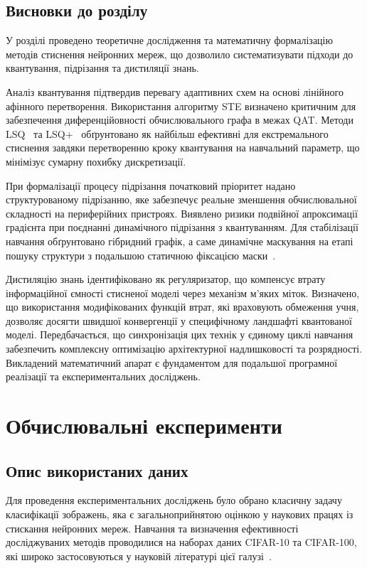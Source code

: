 \documentclass{pma-mthesis}
\begin{document}
\section{Висновки до розділу}

У розділі проведено теоретичне дослідження та математичну формалізацію методів стиснення нейронних мереж, що дозволило систематизувати підходи до квантування, підрізання та дистиляції знань.

Аналіз квантування підтвердив перевагу адаптивних схем на основі лінійного афінного перетворення. Використання алгоритму STE визначено критичним для забезпечення диференційовності обчислювального графа в межах QAT. Методи LSQ~\cite{Esser2020LSQ} та LSQ+~\cite{bhalgat2020lsq+} обґрунтовано як найбільш ефективні для екстремального стиснення завдяки перетворенню кроку квантування на навчальний параметр, що мінімізує сумарну похибку дискретизації.

При формалізації процесу підрізання початковий пріоритет надано структурованому підрізанню, яке забезпечує реальне зменшення обчислювальної складності на периферійних пристроях. Виявлено ризики подвійної апроксимації градієнта при поєднанні динамічного підрізання з квантуванням. Для стабілізації навчання обґрунтовано гібридний графік, а саме динамічне маскування на етапі пошуку структури з подальшою статичною фіксацією маски~\cite{10946020}.

Дистиляцію знань ідентифіковано як регуляризатор, що компенсує втрату інформаційної ємності стисненої моделі через механізм м’яких міток. Визначено, що використання модифікованих функцій втрат, які враховують обмеження учня, дозволяє досягти швидшої конвергенції у специфічному ландшафті квантованої моделі. Передбачається, що синхронізація цих технік у єдиному циклі навчання забезпечить комплексну оптимізацію архітектурної надлишковості та розрядності. Викладений математичний апарат є фундаментом для подальшої програмної реалізації та експериментальних досліджень.

\chapter{Обчислювальні експерименти}

\section{Опис використаних даних}

Для проведення експериментальних досліджень було обрано класичну задачу класифікації зображень, яка є загальноприйнятою оцінкою у наукових працях із стискання нейронних мереж. Навчання та визначення ефективності досліджуваних методів проводилися на наборах даних CIFAR-10 та CIFAR-100, які широко застосовуються у науковій літературі цієї галузі~\cite{krizhevsky2009learning}.
\end{document}

